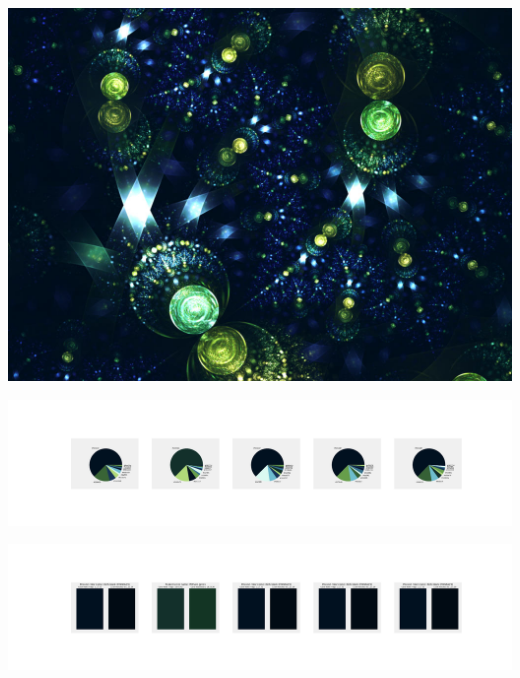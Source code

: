 \documentclass[11pt]{article}
\begin{document}
\begin{landscape}
    \begin{center}
    \includegraphics[width=\textwidth]{./nbimg/file (157).jpg}
    \end{center}

    \begin{center}
    \includegraphics[width=250mm]{./nbimg/pie-64.jpg}
    \end{center}

    \begin{center}
    \includegraphics[width=250mm]{./nbimg/peak-64.jpg}
    \end{center}
    


\end{landscape}
\end{document}

